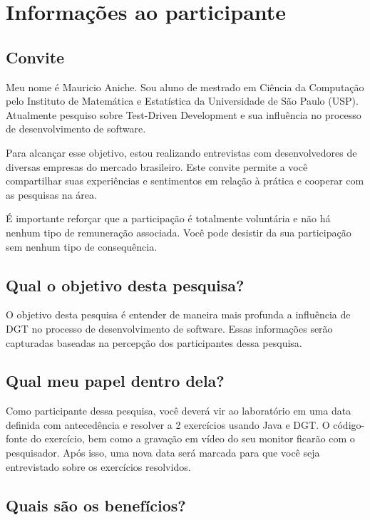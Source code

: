 \chapter{Informações ao participante}
\label{ape:informacoes-participante}

\section{Convite}

Meu nome é Mauricio Aniche. Sou aluno de mestrado em Ciência da Computação pelo
Instituto de Matemática e Estatística da Universidade de São Paulo (USP).
Atualmente pesquiso sobre Test-Driven Development e sua influência no processo
de desenvolvimento de software.

Para alcançar esse objetivo, estou realizando entrevistas com desenvolvedores de
diversas empresas do mercado brasileiro.
Este convite permite a você compartilhar suas experiências e sentimentos em
relação à prática e cooperar com as pesquisas na área.

É importante reforçar que a participação é totalmente voluntária e não há nenhum
tipo de remuneração associada. Você pode desistir da sua participação sem nenhum
tipo de consequência.

\section{Qual o objetivo desta pesquisa?}

O objetivo desta pesquisa é entender de maneira mais profunda a influência de DGT
no processo de desenvolvimento de software. Essas informações serão
capturadas baseadas na percepção dos participantes dessa pesquisa.

\section{Qual meu papel dentro dela?}

Como participante dessa pesquisa, você deverá vir ao laboratório em uma
data definida com antecedência e resolver a 2 exercícios usando Java e DGT.
O código-fonte do exercício, bem como a gravação em vídeo do seu monitor
ficarão com o pesquisador.
Após isso, uma nova data será marcada para que você seja entrevistado sobre
os exercícios resolvidos.

\section{Quais são os benefícios?}

